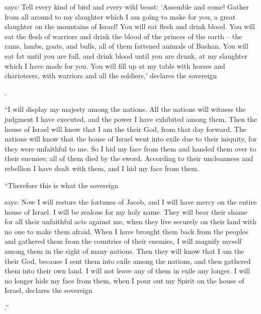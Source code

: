{{}
says: Tell every kind
of bird
and every
wild
beast: ‘Assemble
and come! Gather
from all around
to my slaughter
which
I am
going to make for you, a great
slaughter
on
the mountains
of Israel! You will eat
flesh
and drink
blood.
You will eat
the flesh
of warriors
and drink
the blood
of the princes
of the earth
– the rams,
lambs,
goats,
and bulls,
all
of them fattened animals
of Bashan.
You will eat
fat
until you are full,
and drink
blood
until you are drunk,
at my slaughter
which I have made for you.
You will fill
up at my table
with horses
and charioteers,
with warriors
and all
the soldiers,’
declares
the sovereign

{}.
\par }{\PP {}“I will display
my majesty
among the nations.
All
the nations
will witness
the judgment
I have executed,
and the power
I have
exhibited among them.
Then the house
of Israel
will know
that
I am
the {}
their God,
from
that day
forward.
The nations
will know
that
the house
of Israel
went into exile
due to their iniquity,
for they were unfaithful
to me. So I hid
my face
from them
and handed
them over
to their enemies;
all
of them died
by the sword.
According to their uncleanness
and rebellion
I have dealt
with them,
and I hid
my face
from them.
\par }{\PP {}“Therefore
this is what
the sovereign

{}
says: Now
I will restore
the fortunes
of Jacob,
and I will have mercy
on the entire
house
of Israel.
I will be zealous
for my holy
name.
They will bear
their shame
for all
their unfaithful
acts against me, when
they live
securely
on
their land
with no
one to make them afraid.
When I have brought them
back
from
the peoples
and gathered
them from the countries
of their enemies,
I will magnify
myself among them in the sight
of many
nations.
Then they will know
that
I am
the {}
their God,
because I sent them
into exile
among the nations,
and then gathered
them into their own land.
I will not
leave any
of them
in exile
any longer.
I will no
longer
hide
my face
from them,
when I pour
out my Spirit
on
the house
of Israel,
declares
the sovereign

{}.”

}

